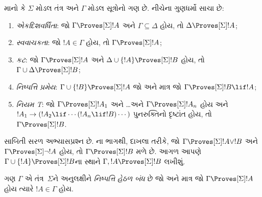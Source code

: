 \begingroup
\makeatletter{}\makeatother


\label{guunit:OLP-0439}


\begin{prop}
  માનો કે $\Sigma$ મોડલ તંત્ર અને $\Gamma$ મોડલ સૂત્રોનો ગણ છે.
  નીચેના ગુણધર્મો સાચા છે:
  \begin{enumerate}
  \item{} \emph{એકદિશવર્ધિતા}: જો
    $\Gamma \Proves[\Sigma] !A$ અને $\Gamma \subseteq \Delta$ હોય, તો
    $\Delta \Proves[\Sigma] !A$;
  \item{}
    \emph{સ્વવાચકતા}: જો $!A \in \Gamma$ હોય, તો $\Gamma
    \Proves[\Sigma] !A$;
  \item{} \emph{કટ}: જો $\Gamma
    \Proves[\Sigma] !A$ અને $\Delta \cup \{!A\} \Proves[\Sigma] !B$
    હોય, તો $\Gamma \cup \Delta \Proves[\Sigma] !B$;
  \item{} \emph{નિષ્પત્તિ પ્રમેય}:
    $\Gamma \cup \{!B\}
    \Proves[\Sigma] !A$ જો અને માત્ર જો $\Gamma \Proves[\Sigma] !B \lif
      !A$;
  \item {}\emph{નિયમ T}: જો
    $\Gamma \Proves[\Sigma] !A_1$ અને \dots અને $\Gamma
    \Proves[\Sigma] !A_n$ હોય અને $!A_1 \to (!A_2 \lif \cdots (!A_n \lif
    !B)\cdots)$ પુનરુક્તિનો દૃષ્ટાંત હોય, તો $\Gamma
    \Proves[\Sigma] !B$.
  \end{enumerate}
\end{prop}

સાબિતી સરળ અભ્યાસપ્રશ્ન છે. ના
 ભાગથી, દાખલા તરીકે, જો
$\Gamma \Proves[\Sigma] !A \lor !B$ અને
$\Gamma \Proves[\Sigma] \lnot !A$ હોય, તો $\Gamma \Proves[\Sigma]
!B$ મળે છે. આગળ આપણે $\Gamma \cup \{ !A\} \Proves[\Sigma] !B$ના
સ્થાને $\Gamma, !A \Proves[\Sigma] !B$ લખીશું.

\begin{defn}
  ગણ $\Gamma$ એ તંત્ર~$\Sigma$ને અનુલક્ષીને \emph{નિષ્પત્તિ હેઠળ બંધ}
  છે જો અને માત્ર જો $\Gamma \Proves[\Sigma] !A$ હોય ત્યારે
  $!A \in \Gamma$ હોય.
\end{defn}
\endgroup

